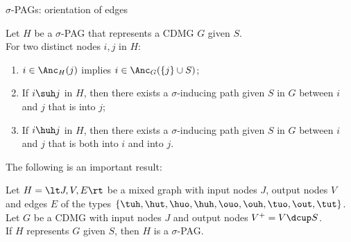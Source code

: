 \begin{frame}{$\sigma$-PAGs: orientation of edges}
\begin{Lem}[\ref{lem:sigmapag_ancestral_relations} \& \ref{lem:sigma-inducing_path_into}]
  Let $H$ be a $\sigma$-PAG that represents a CDMG $G$ given $S$. \\
  For two distinct nodes $i,j$ in $H$: 
  \begin{enumerate}
    \item $i \in \Anc_{H}(j)$ implies $i \in \Anc_{G}(\{j\} \cup S)$;
    \item If $i \suh j$ in $H$, then there exists a $\sigma$-inducing path given $S$ in $G$ between $i$ and $j$ that is into $j$;
    \item If $i \huh j$ in $H$, then there exists a $\sigma$-inducing path given $S$ in $G$ between $i$ and $j$ that is both into $i$ and into $j$.
  \end{enumerate}
\end{Lem}
The following is an important result:
\begin{Prp}[\ref{prp:sigmapag_represents_cdmg_is_valid}]
  Let $H = \lt J,V,E\rt$ be a mixed graph with input nodes $J$, output nodes $V$ and edges $E$ of the types $\{\tuh,\hut,\huo,\huh,\ouo,\ouh,\tuo,\out,\tut\}$.\\
  Let $G$ be a CDMG with input nodes $J$ and output nodes $V^+ = V \dcup S$.\\
  If $H$ represents $G$ given $S$, then $H$ is a $\sigma$-PAG.
\end{Prp}
\end{frame}

